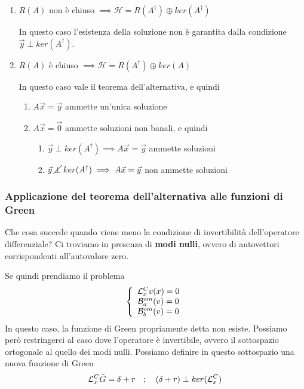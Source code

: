 \begin{enumerate}
	\item $R(A)$ non è chiuso $\implies \mathcal{H} = R(A^\dagger) \oplus ker(A^\dagger)$
	
	In questo caso l'esistenza della soluzione non è garantita dalla condizione $\vec{y} \perp ker(A^\dagger)$.
	
	\item $R(A)$ è chiuso $\implies \mathcal{H} = R(A^\dagger) \oplus ker(A)$
	
	In questo caso vale il teorema dell'alternativa, e quindi
	\begin{enumerate}
		\item $A \vec{x} = \vec{y}$ ammette un'unica soluzione
		
		\item $A \vec{x} = \vec{0}$ ammette soluzioni non banali, e quindi		
		\begin{enumerate}
			\item $\vec{y} \perp ker(A^\dagger) \implies A \vec{x} = \vec{y}$ ammette soluzioni
			\item $\vec{y} \; \cancel{\perp} \; ker(A^\dagger) \implies A \vec{x} = \vec{y}$ non ammette soluzioni
		\end{enumerate}
	\end{enumerate}
\end{enumerate}


\subsubsection{Applicazione del teorema dell'alternativa alle funzioni di Green}

Che cosa succede quando viene meno la condizione di invertibilità dell'operatore differenziale? Ci troviamo in presenza di \textbf{modi nulli}, ovvero di autovettori corrispondenti all'autovalore zero. 

Se quindi prendiamo il problema
\begin{align}
	\left\{ \begin{array}{ccc} \mathcal{L}_x^C v(x)=0\\ \mathcal{B}_a^{om}(v) = 0\\ \mathcal{B}_b^{om}(v) = 0 \end{array} \right.
\end{align}
In questo caso, la funzione di Green propriamente detta non esiste. Possiamo però restringerci al caso dove l'operatore è invertibile, ovvero il sottospazio ortogonale al quello dei modi nulli. 
Possiamo definire in questo sottospazio una nuova funzione di Green
\begin{align}
	\mathcal{L}_x^C \tilde{G} = \delta + r \quad ; \quad (\delta + r) \perp ker(\mathcal{L}_x^C) 
\end{align}

